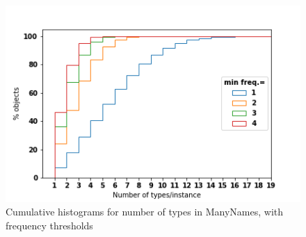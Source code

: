%




\begin{figure}
\vspace{-4ex}
\includegraphics[width=\columnwidth]{figures/types_instances.png}
 \caption{\label{fig:ntypes} Cumulative histograms for number of types in ManyNames, with frequency thresholds} 
\end{figure}

